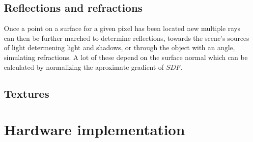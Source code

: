 \subsection{Reflections and refractions}

Once a point on a surface for a given pixel has been located new multiple rays
can then be further marched to determine reflections, towards the scene's
sources of light determening light and shadows, or through the object with an
angle, simulating refractions. A lot of these depend on the surface normal
which can be calculated by normalizing the aproximate gradient of $SDF$. 

\subsection{Textures}



\section{Hardware implementation}


